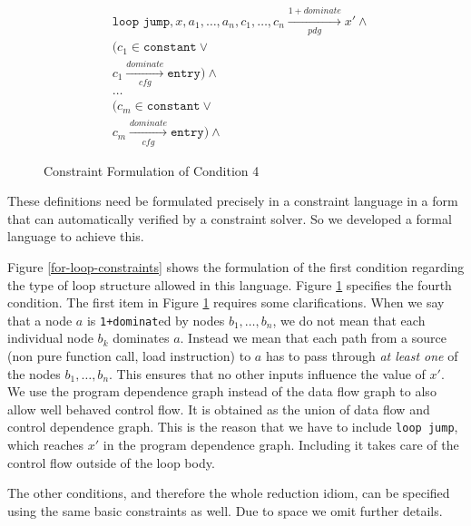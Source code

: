 \begin{figure}[ht]
\begin{align*}
&\texttt{loop jump},x,a_1,\dots,a_n,c_1,\dots,c_n\xrightarrow[pdg]{1+dominate}x'\mathrel{\land}\\
&(c_1\in\texttt{constant}\mathrel{\lor}\\
&c_1\xrightarrow[cfg]{dominate}\texttt{entry})\mathrel{\land}\\
&\dots\\
&(c_m\in\texttt{constant}\mathrel{\lor}\\
&c_m\xrightarrow[cfg]{dominate}\texttt{entry})\mathrel{\land}
\end{align*}
\caption{Constraint Formulation of Condition 4}
\label{dom-expr-constraints}
\end{figure}

These definitions 
need be formulated precisely in a constraint language in a form that can 
automatically verified by a constraint solver.
So we  developed a
formal language  to achieve this.

Figure \ref{for-loop-constraints} shows
the formulation of the first condition regarding the type of loop structure allowed in this language.  
Figure \ref{dom-expr-constraints} specifies the fourth condition.
The first item in Figure \ref{dom-expr-constraints}  requires some clarifications.
When we say that a node $a$ is {\tt 1+dominat}ed by nodes $b_1,\dots,b_n$, we do not mean that each individual node $b_k$ dominates $a$.
Instead we mean that each path from a source (non pure function call, load instruction) to $a$ has to pass through {\em at least one} of the nodes $b_1,\dots,b_n$.
This ensures that no other inputs influence the value of $x'$.
We use the program dependence graph instead of the data flow graph to also allow well behaved control flow.
It is obtained as the union of data flow and control dependence graph.
This is the reason that we have to include \texttt{loop jump}, which reaches $x'$ in the program dependence graph.
Including it takes care of the control flow outside of the loop body.

The other conditions, and therefore the whole reduction idiom, can be specified using the same basic constraints as well.
Due to space we omit further details.

